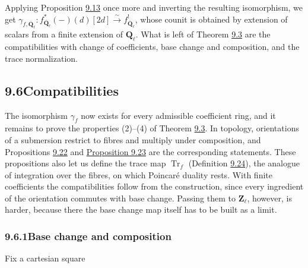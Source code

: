 \documentclass[11pt]{article}
\begin{document}
\label{bp71}%
Applying Proposition \hyperref[bp41]{9.13} once more and inverting the resulting isomorphism, we get \(\gamma_{f,\overline{\mathbf Q}_\ell}:f_{\overline{\mathbf Q}_\ell}^*(-)(d)[2d]\xrightarrow{\sim}f^!_{\overline{\mathbf Q}_\ell}\), whose counit is obtained by extension of scalars from a finite extension of \(\mathbf Q_\ell\). What is left of Theorem \hyperref[bp9]{9.3} are the compatibilities with change of coefficients, base change and composition, and the trace normalization.



\subsection*{\texorpdfstring{9.6\quad Compatibilities}{9.6 Compatibilities}}
\label{bp72}%
\label{bp73}%
The isomorphism \(\gamma_f\) now exists for every admissible coefficient ring, and it remains to prove the properties (2)–(4) of Theorem \hyperref[bp9]{9.3}. In topology, orientations of a submersion restrict to fibres and multiply under composition, and Propositions \hyperref[bp76]{9.22} and \hyperref[bp79]{Proposition 9.23} are the corresponding statements. These propositions also let us define the trace map \(\operatorname{Tr}_f\) (Definition \hyperref[bp83]{9.24}), the analogue of integration over the fibres, on which Poincaré duality rests. With finite coefficients the compatibilities follow from the construction, since every ingredient of the orientation commutes with base change. Passing them to \(\mathbf Z_\ell\), however, is harder, because there the base change map itself has to be built as a limit.

\subsubsection*{\texorpdfstring{9.6.1\quad Base change and composition}{9.6.1 Base change and composition}}
\label{bp74}%
\label{bp75}%
Fix a cartesian square
\end{document}
